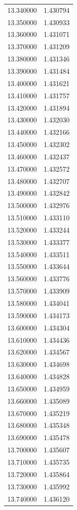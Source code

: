 \begin{tabular}{rr}
13.340000 & 1.430794 \\
13.350000 & 1.430933 \\
13.360000 & 1.431071 \\
13.370000 & 1.431209 \\
13.380000 & 1.431346 \\
13.390000 & 1.431484 \\
13.400000 & 1.431621 \\
13.410000 & 1.431757 \\
13.420000 & 1.431894 \\
13.430000 & 1.432030 \\
13.440000 & 1.432166 \\
13.450000 & 1.432302 \\
13.460000 & 1.432437 \\
13.470000 & 1.432572 \\
13.480000 & 1.432707 \\
13.490000 & 1.432842 \\
13.500000 & 1.432976 \\
13.510000 & 1.433110 \\
13.520000 & 1.433244 \\
13.530000 & 1.433377 \\
13.540000 & 1.433511 \\
13.550000 & 1.433644 \\
13.560000 & 1.433776 \\
13.570000 & 1.433909 \\
13.580000 & 1.434041 \\
13.590000 & 1.434173 \\
13.600000 & 1.434304 \\
13.610000 & 1.434436 \\
13.620000 & 1.434567 \\
13.630000 & 1.434698 \\
13.640000 & 1.434828 \\
13.650000 & 1.434959 \\
13.660000 & 1.435089 \\
13.670000 & 1.435219 \\
13.680000 & 1.435348 \\
13.690000 & 1.435478 \\
13.700000 & 1.435607 \\
13.710000 & 1.435735 \\
13.720000 & 1.435864 \\
13.730000 & 1.435992 \\
13.740000 & 1.436120 \\

\end{tabular}
